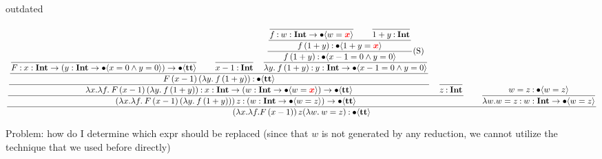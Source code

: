 \documentclass{article}
\begin{document}
outdated

\begin{equation*}
    \dfrac{
    \dfrac{
        \dfrac{
            \dfrac{
                    \dfrac{
                    }{
                    F \mathbin{:} {x} : \textbf{Int} \to ({y} : \textbf{Int} \to \bullet \langle x = 0 \wedge y = 0 \rangle) \to \bullet \langle \textbf{tt} \rangle
                    }
                    \qquad
                    \dfrac{}{
                    x - 1 \mathbin{:} \textbf{Int}
                    }
                \quad
                \dfrac{
                    \dfrac{
                        \dfrac{
                            \dfrac{}{
                                f \mathbin{:} {w} : \textbf{Int} \to \bullet \langle w=\textcolor{red}{\boldsymbol x} \rangle
                            }
                            \qquad
                            \dfrac{}{
                                1+y \mathbin{:} \textbf{Int}
                            }
                        }{
                            f\,(1+y) \mathbin{:} \bullet \langle 1+y=\textcolor{red}{\boldsymbol x} \rangle
                        }
                    } {
                        f\,(1+y) \mathbin{:} \bullet \langle x - 1 = 0 \wedge y = 0 \rangle
                    }\text{(S)}
                } {
                    \lambda y.\: f\,(1+y) \mathbin{:} {y} : \textbf{Int} \to \bullet \langle x - 1 = 0 \wedge y = 0 \rangle
                }
            }{
                F\, (x-1)\, (\lambda y.\: f\,(1+y))  \mathbin{:} \bullet \langle \textbf{tt} \rangle
            }
        }{
            \lambda x. \lambda f.\: F\, (x-1)\, (\lambda y.\: f\,(1+y)) \mathbin{:} {x} : \textbf{Int} \to ({w} : \textbf{Int} \to \bullet \langle w = \textcolor{red}{\boldsymbol x} \rangle) \to \bullet \langle \textbf{tt} \rangle
        }
        \quad
        \dfrac{}{
        z \mathbin{:} \textbf{Int}
        }
        }{
            (\lambda x. \lambda f.\: F\, (x-1)\, (\lambda y.\: f\,(1+y)))\, z \mathbin{:} ({w} : \textbf{Int} \to \bullet \langle w = z \rangle) \to \bullet \langle \textbf{tt} \rangle
        }
        \qquad 
        \dfrac{
            w = z \mathbin{:} \bullet \langle  w = z \rangle
        }{
            \lambda w. w = z \mathbin{:} {w} : \textbf{Int} \to \bullet \langle w = z \rangle
        }
    }{
        (\lambda x. \lambda f. F\, (x-1))\, z (\lambda w.\: w = z) \mathbin{:} \bullet \langle \textbf{tt} \rangle
    }
\end{equation*}

Problem: how do I determine which expr should be replaced
(since that \( w \) is not generated by any reduction, we cannot utilize the technique that we used before directly)
\end{document}
